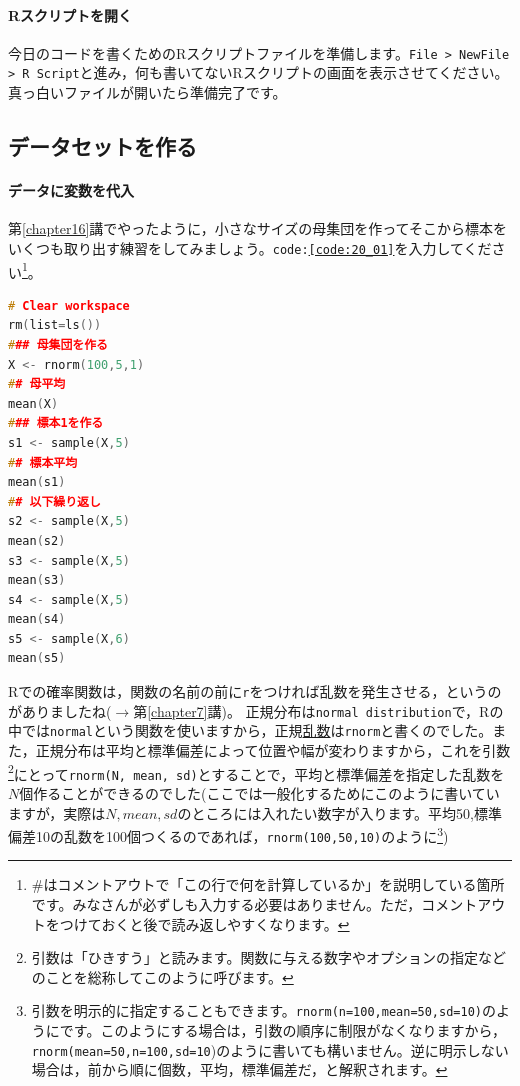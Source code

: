 \documentclass{ltjsbook}
\begin{document}
\paragraph{Rスクリプトを開く}今日のコードを書くためのRスクリプトファイルを準備します。\verb|File > NewFile > R Script|と進み，何も書いてないRスクリプトの画面を表示させてください。真っ白いファイルが開いたら準備完了です。

\subsection{データセットを作る}
\paragraph{データに変数を代入}
第\ref{chapter16}講でやったように，小さなサイズの母集団を作ってそこから標本をいくつも取り出す練習をしてみましょう。\texttt{code:\ref{code:20_01}}を入力してください\footnote{\#はコメントアウトで「この行で何を計算しているか」を説明している箇所です。みなさんが必ずしも入力する必要はありません。ただ，コメントアウトをつけておくと後で読み返しやすくなります。}。

\begin{lstlisting}[language=c++,label={code:20_01},caption={繰り返しサンプリングする}]
# Clear workspace
rm(list=ls())
### 母集団を作る
X <- rnorm(100,5,1)
## 母平均
mean(X)
### 標本1を作る
s1 <- sample(X,5)
## 標本平均
mean(s1)
## 以下繰り返し
s2 <- sample(X,5)
mean(s2)
s3 <- sample(X,5)
mean(s3)
s4 <- sample(X,5)
mean(s4)
s5 <- sample(X,6)
mean(s5)
\end{lstlisting}

Rでの確率関数は，関数の名前の前に\texttt{r}をつければ乱数を発生させる，というのがありましたね($\to$第\ref{chapter7}講)。
正規分布は\verb|normal distribution|で，Rの中では\texttt{normal}という関数を使いますから，正規\underline{乱数}は\texttt{rnorm}と書くのでした。また，正規分布は平均と標準偏差によって位置や幅が変わりますから，これを引数\footnote{引数は「ひきすう」と読みます。関数に与える数字やオプションの指定などのことを総称してこのように呼びます。}にとって\texttt{rnorm(N, mean, sd)}とすることで，平均と標準偏差を指定した乱数を$N$個作ることができるのでした(ここでは一般化するためにこのように書いていますが，実際は$N,mean,sd$のところには入れたい数字が入ります。平均50,標準偏差10の乱数を100個つくるのであれば，\texttt{rnorm(100,50,10)}のように\footnote{引数を明示的に指定することもできます。\texttt{rnorm(n=100,mean=50,sd=10)}のようにです。このようにする場合は，引数の順序に制限がなくなりますから，\texttt{rnorm(mean=50,n=100,sd=10})のように書いても構いません。逆に明示しない場合は，前から順に個数，平均，標準偏差だ，と解釈されます。})
\end{document}

